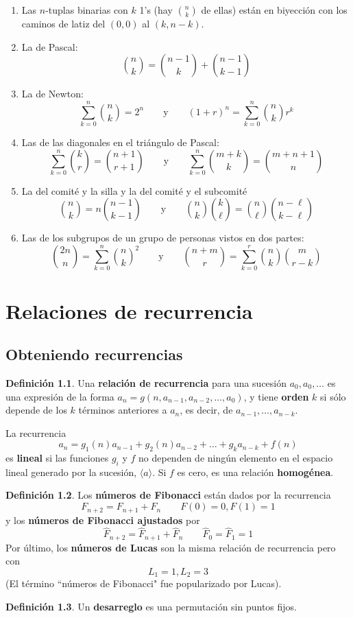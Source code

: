 \documentclass[spanish]{book}
\theoremstyle{definition}
\newtheorem*{defn}{Definición}
\begin{document}
	\begin{enumerate}
		\item Las $n$-tuplas binarias con $k$ 1's (hay ${n\choose k}$ de ellas) están en biyección con los caminos de latiz del $(0,0)$ al $(k,n-k)$.

		\item La de Pascal:
		\[{n\choose k}={n-1\choose k}+{n-1\choose k-1}\]

		\item La de Newton: \[\sum_{k=0}^n{n\choose k}=2^n\qquad\text{y}\qquad (1+r)^n=\sum_{k=0}^n{n\choose k}r^k\]

		\item Las de las diagonales en el triángulo de Pascal: \[\sum_{k=0}^n{k\choose r}={n+1\choose r+1}\qquad\text{y}\qquad \sum_{k=0}^n{m+k\choose k}={m+n+1\choose n}\]

		\item La del comité y la silla y la del comité y el subcomité
		\[{n\choose k}=n{n-1\choose k-1}\qquad\text{y}\qquad {n\choose k}{k\choose \ell}={n\choose\ell}{n-\ell\choose k-\ell}\]
		
		\item Las de los subgrupos de un grupo de personas vistos en dos partes:
		\[{2n\choose n}=\sum_{k=0}^n{n\choose k}^2\qquad\text{y}\qquad{n+m\choose r}=\sum_{k=0}^r{n\choose k}{m\choose r-k}\]
		
		

	\end{enumerate}
\chapter{Relaciones de recurrencia}
\section{Obteniendo recurrencias}
	\begin{defn}
		Una \textbf{relación de recurrencia} para una sucesión $a_0,a_0,\ldots$ es una expresión de la forma $a_n=g(n,a_{n-1},a_{n-2},\ldots,a_0)$, y tiene \textbf{orden} $k$ si sólo depende de los $k$ términos anteriores a $a_n$, es decir, de $a_{n-1},\ldots,a_{n-k}$.
		
		La recurrencia \[a_n=g_{1}(n)a_{n-1}+g_{2}(n)a_{n-2}+\ldots+g_ka_{n-k}+f(n)\]
		es \textbf{lineal} si las funciones $g_i$ y $f$ no dependen de ningún elemento en el espacio lineal generado por la sucesión, $\langle a\rangle$. Si $f$ es cero, es una relación \textbf{homogénea}.
	\end{defn}
	\begin{defn}
		Los \textbf{números de Fibonacci} están dados por la recurrencia
		\[F_{n+2}=F_{n+1}+F_n\qquad F(0)=0,F(1)=1\]
		y los \textbf{números de Fibonacci ajustados} por
		\[\hat{F}_{n+2}=\hat{F}_{n+1}+\hat{F}_n\qquad \hat{F}_0=\hat{F}_1=1\]
		Por último, los \textbf{números de Lucas} son la misma relación de recurrencia pero con
		\[L_1=1,L_2=3\]
		(El término ``números de Fibonacci" fue popularizado por Lucas).
		
	\end{defn}
	\begin{defn}
		Un \textbf{desarreglo} es una permutación sin puntos fijos.
	\end{defn}
\end{document}
